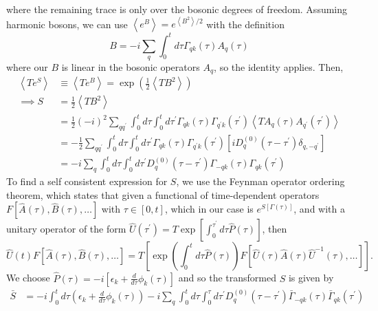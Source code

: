  where the remaining trace is only over the bosonic degrees of freedom. Assuming harmonic bosons, we can use $\left\langle e^B \right\rangle = e^{\left\langle B^2\right\rangle / 2}$ with the definition
\begin{equation}
    B=-i \sum_q \int_0^t d \tau \Gamma_{q k}(\tau) A_q(\tau)
\end{equation}
where our $B$ is linear in the bosonic operators $A_q$, so the identity applies. Then, 
\begin{align}
\left\langle T e^S\right\rangle & \equiv \left\langle T e^B\right\rangle = \exp\left(\frac{1}{2}\left\langle T B^2\right\rangle\right) \\
\implies S & =\frac{1}{2}\left\langle T B^2\right\rangle \\
& =\frac{1}{2}(-i)^2 \sum_{q q^{\prime}} \int_0^t d \tau \int_0^t d \tau^{\prime} \Gamma_{q k}(\tau) \Gamma_{q^{\prime} k}\left(\tau^{\prime}\right)\left\langle T A_q(\tau) A_{q^{\prime}}\left(\tau^{\prime}\right)\right\rangle \\
& =-\frac{1}{2} \sum_{q q^{\prime}} \int_0^t d \tau \int_0^t d \tau^{\prime} \Gamma_{q k}(\tau) \Gamma_{q^{\prime} k}\left(\tau^{\prime}\right)\left[i D_q^{(0)}\left(\tau-\tau^{\prime}\right) \delta_{q,-q^{\prime}}\right] \\
& = -i \sum_q \int_0^t d \tau \int_0^t d \tau^{\prime} D_q^{(0)}\left(\tau-\tau^{\prime}\right) \Gamma_{-q k}(\tau) \Gamma_{q k}\left(\tau^{\prime}\right) 
\end{align}
To find a self consistent expression for $S$, we use the Feynman operator ordering theorem, which states that given a functional of time-dependent operators $F[\hat{A}(\tau), \hat{B}(\tau), \ldots]$ with $\tau \in[0, t]$, which in our case is $e^{S[\Gamma (\tau)]}$, and with a unitary operator of the form $\hat{U}\left(\tau^{\prime}\right)=T \exp \left[\int_0^{\tau^{\prime}} d \tau \hat{P}(\tau)\right]$, then
\begin{equation}
\hat{U}(t) F[\hat{A}(\tau), \hat{B}(\tau), \ldots] =T\left[\exp \left(\int_0^t d \tau \hat{P}(\tau)\right) F\left[\hat{U}(\tau) \hat{A}(\tau) \hat{U}^{-1}(\tau), \ldots\right]\right] .
\end{equation}
We choose $\hat{P}(\tau)=-i\left[\epsilon_k+\frac{d}{d \tau} \phi_k(\tau)\right]$ and
so the transformed $S$ is given by
\begin{align}
    \bar{S}
&= -i \int_0^t d \tau\left(\epsilon_k+\frac{d}{d \tau} \phi_k(\tau)\right) -i \sum_q \int_0^t d \tau \int_0^\tau d \tau^{\prime} D_q^{(0)}\left(\tau-\tau^{\prime}\right) \bar{\Gamma}_{-q k}(\tau) \bar{\Gamma}_{q k}\left(\tau^{\prime}\right)
\end{align}
